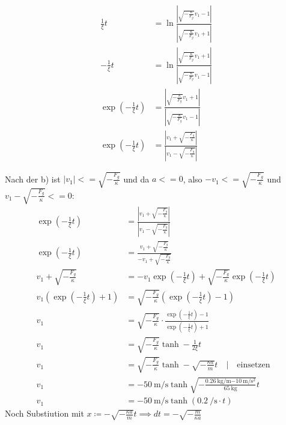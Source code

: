 \documentclass[sectionformat = aufgabe]{gadsescript}
\begin{document}
\begin{enumerate}[label=\alph*)]
\begin{align*}
			\frac{1}{\xi} t &= \ln \frac{\left|\sqrt{-\frac{\kappa}{F_g}} v_1 - 1\right|}{\left|\sqrt{-\frac{\kappa}{F_g}} v_1 + 1\right|}\\
			- \frac{1}{\xi} t &= \ln \frac{\left|\sqrt{-\frac{\kappa}{F_g}} v_1 + 1\right|}{\left|\sqrt{-\frac{\kappa}{F_g}} v_1 - 1\right|}\\
			\exp(- \frac{1}{\xi} t) &= \frac{\left|\sqrt{-\frac{\kappa}{F_g}} v_1 + 1\right|}{\left|\sqrt{-\frac{\kappa}{F_g}} v_1 - 1\right|}\\
			\exp(- \frac{1}{\xi} t) &= \frac{\left| v_1 + \sqrt{-\frac{F_g}{\kappa}}\right|}{\left| v_1 - \sqrt{-\frac{F_g}{\kappa}}\right|}
		\end{align*}%

		Nach der b) ist
		$ |v_1| <= \sqrt{-\frac{F_g}{\kappa}} $
		und da $a <= 0 $, also $ -v_1 <= \sqrt{ - \frac{F_g}{\kappa}} $
		und $ v_1 - \sqrt{ - \frac{F_g}{\kappa}} <= 0 $:
		\begin{align*}
			\exp\left(- \frac{1}{\xi} t\right) &= \frac{\left| v_1 + \sqrt{-\frac{F_g}{\kappa}}\right|}{\left| v_1 - \sqrt{-\frac{F_g}{\kappa}}\right|}\\
			\exp\left(- \frac{1}{\xi} t\right) &= \frac{ v_1 + \sqrt{-\frac{F_g}{\kappa}}}{ - v_1 + \sqrt{-\frac{F_g}{\kappa}}}\\
			 v_1 + \sqrt{-\frac{F_g}{\kappa}} &= -v_1 \exp\left(- \frac{1}{\xi} t\right) + \sqrt{- \frac{F_g}{\kappa}} \exp\left(-\frac{1}{\xi}t\right)\\
			v_1 \left(\exp\left(- \frac{1}{\xi} t\right) + 1\right) &= \sqrt{-\frac{F_g}{\kappa}} \left(\exp\left(-\frac{1}{\xi}t\right) - 1 \right)\\
			v_1 &= \sqrt{-\frac{F_g}{\kappa}} \cdot \frac{\exp\left(-\frac{1}{\xi}t\right) - 1 }{\exp\left(- \frac{1}{\xi} t\right) + 1} \\
			v_1 &= \sqrt{-\frac{F_g}{\kappa}} \tanh-\frac{1}{2\xi} t\\
			v_1 &= \sqrt{-\frac{F_g}{\kappa}} \tanh-\sqrt{-\frac{\kappa a}{m}} t \quad | \quad \text{einsetzen}\\
			v_1 &= - \qty[exponent-mode = input]{50}{\metre\per\second}  \tanh\sqrt{-\frac{\qty[exponent-mode = input]{0.26}{\kilogram\per\metre} \qty[exponent-mode = input]{-10}{\metre\per\square\second}}{\qty[exponent-mode = input]{65}{\kilogram}}} t\\
			v_1 &= - \qty{50}{\metre\per\second}  \tanh \left( \qty{0.2}{\per\second} \cdot t \right)
		\end{align*}
		Noch Substiution mit $ x \coloneqq - \sqrt{-\frac{\kappa a}{m}} t \implies dt = - \sqrt{-\frac{m}{\kappa a}} $

\end{enumerate}
\end{document}

